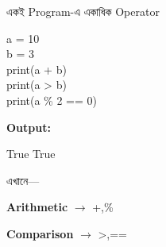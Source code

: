 \begin{examplebox}{একই Program-এ একাধিক Operator}

\begin{codebox}
\begin{english}
\ttfamily
a = 10\\
b = 3\\
print(a + b)\\
print(a > b)\\
print(a \% 2 == 0)
\end{english}
\end{codebox}

\textbf{Output:}

\begin{center}

\textenglish{}
\qquad
\textenglish{\ttfamily True}
\qquad
\textenglish{\ttfamily True}

\end{center}

এখানে—

\begin{center}

\textbf{Arithmetic}
\(\longrightarrow\)
\textenglish{\ttfamily +,\;\%}

\qquad

\textbf{Comparison}
\(\longrightarrow\)
\textenglish{\ttfamily >,\;==}

\end{center}

\end{examplebox}



